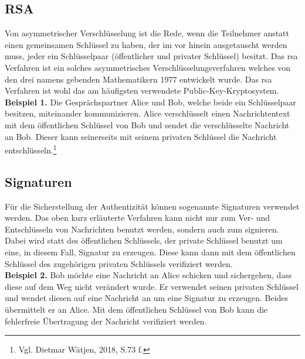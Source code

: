 {		\subsection{RSA}
		Von asymmetrischer Verschlüsselung ist die Rede, wenn die Teilnehmer anstatt einen gemeinsamen Schlüssel zu haben, der im vor hinein ausgetauscht werden muss, jeder ein Schlüsselpaar (öffentlicher und privater Schlüssel) besitzt. Das \gls{rsa} Verfahren ist ein solches asymmetrisches Verschlüsselungsverfahren welches von den drei namens gebenden Mathematikern 1977 entwickelt wurde. Das \gls{rsa} Verfahren ist wohl das am häufigsten verwendete Public-Key-Kryptosystem.\\
		\textbf{Beispiel 1.} Die Gesprächspartner Alice und Bob, welche beide ein Schlüsselpaar besitzen, miteinander kommunizieren. Alice verschlüsselt einen Nachrichtentext mit dem öffentlichen Schlüssel von Bob und sendet die verschlüsselte Nachricht an Bob. Dieser kann seinerseits mit seinem privaten Schlüssel die Nachricht entschlüsseln.\footnote{Vgl. Dietmar Wätjen, 2018, S.73 f.}\\
		\subsection{Signaturen}
		Für die Sicherstellung der Authentizität können sogenannte Signaturen verwendet werden. Das oben kurz erläuterte Verfahren kann nicht nur zum Ver- und Entschlüsseln von Nachrichten benutzt werden, sondern auch zum signieren.\\
		Dabei wird statt des öffentlichen Schlüssels, der private Schlüssel benutzt um eine, in diesem Fall, Signatur zu erzeugen. Diese kann dann mit dem öffentlichen Schlüssel des zugehörigen privaten Schlüssels verifiziert werden.\\
		\textbf{Beispiel 2.} Bob möchte eine Nachricht an Alice schicken und sichergehen, dass diese auf dem Weg nicht verändert wurde. Er verwendet seinen privaten Schlüssel und wendet diesen auf eine Nachricht an um eine Signatur zu erzeugen. Beides übermittelt er an Alice. Mit dem öffentlichen Schlüssel von Bob kann die fehlerfreie Übertragung der Nachricht verifiziert werden.
	}
			
